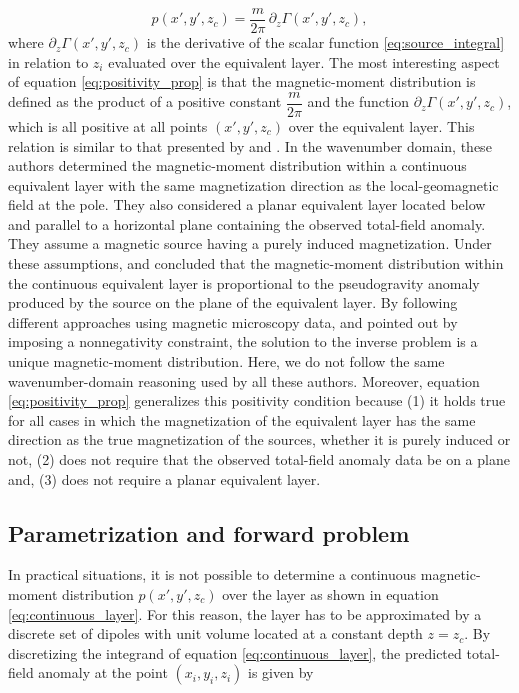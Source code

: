 \begin{equation}
p(x',y',z_c) = \dfrac{m}{2\pi} \, \partial_{z} \Gamma(x',y',z_c) ,
\label{eq:positivity_prop}
\end{equation}
where $\partial_{z} \Gamma(x',y',z_c)$ is the derivative of the scalar function \ref{eq:source_integral} in relation to $z_i$ evaluated over the equivalent layer. The most interesting aspect of equation \ref{eq:positivity_prop} is that the magnetic-moment distribution is defined as the product of a positive constant $\dfrac{m}{2\pi}$ and the function $\partial_{z} \Gamma(x',y',z_c)$, which is all positive at all points $(x',y',z_c)$ over the equivalent layer. This relation is similar to that presented by \cite{pedersen1991} and \cite{li_etal_2014}. In the wavenumber domain, these authors determined the magnetic-moment distribution within a continuous equivalent layer with the same magnetization direction as the local-geomagnetic field at the pole. They also considered a planar equivalent layer located below and parallel to a horizontal plane containing the observed total-field anomaly. They assume a magnetic source having a purely induced magnetization. Under these assumptions, \cite{pedersen1991} and \cite{li_etal_2014} concluded that the magnetic-moment distribution within the continuous equivalent layer is proportional to the pseudogravity anomaly produced by the source on the plane of the equivalent layer. By following different approaches using magnetic microscopy data, \cite{baratchart2013} and \cite{lima_weiss_2016} pointed out by imposing a nonnegativity constraint, the solution to the inverse problem is a unique magnetic-moment distribution. Here, we do not follow the same wavenumber-domain reasoning used by all these authors. Moreover, equation \ref{eq:positivity_prop} generalizes this positivity condition because (1) it holds true for all cases in which the magnetization of the equivalent layer has the same direction as the true
magnetization of the sources, whether it is purely induced or not, (2) does not require that the observed total-field anomaly data be on a plane and, (3) does not require a planar equivalent layer.

\subsection{Parametrization and forward problem}

In practical situations, it is not possible to determine a continuous magnetic-moment distribution $p(x',y',z_c)$ over the layer as shown in equation \ref{eq:continuous_layer}. For this reason, the layer has to be approximated by a discrete set of dipoles with unit volume located at a constant depth $z = z_c$. By discretizing the integrand of equation \ref{eq:continuous_layer}, the predicted total-field anomaly at the point $(x_i,y_i,z_i)$ is given by 

